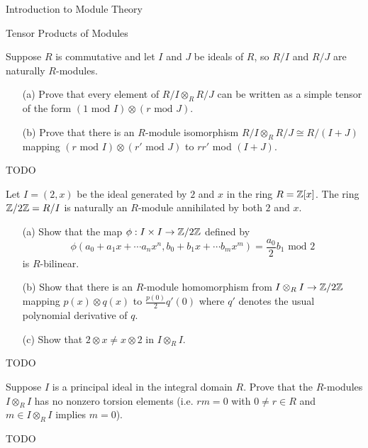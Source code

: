 \begin{chapter}{Introduction to Module Theory}
\begin{section}{Tensor Products of Modules}
\begin{problem}\label{ex:10.4.16}
Suppose $R$ is commutative and let $I$ and $J$ be ideals of $R$, so $R/I$ and $R/J$ are naturally $R$-modules. \begin{enumerate}
\item[(a)] Prove that every element of $R/I\otimes _R R/J$ can be written as a simple tensor of the form $(1\text{ mod } I)\otimes (r\text{ mod } J)$. 
\item[(b)] Prove that there is an $R$-module isomorphism $R/I\otimes_R R/J\cong R/(I+J)$ mapping $(r\text{ mod } I)\otimes (r'\text{ mod } J)$ to $rr'$ mod $(I+J)$. 
\end{enumerate}
\end{problem}
\begin{solution}TODO

\end{solution}\oneperpage



\begin{problem}\label{ex:10.4.17}
Let $I=(2,x)$ be the ideal generated by $2$ and $x$ in the ring $R=\mathbb{Z}[x]$. The ring $\mathbb{Z}/2\mathbb{Z} = R/I$ is naturally an $R$-module annihilated by both $2$ and $x$. \begin{enumerate}
\item[(a)] Show that the map $\phi:I\times I\to \mathbb{Z}/2\mathbb{Z}$ defined by \[
\phi(a_0+a_1x+\cdots a_nx^n,b_0+b_1x+\cdots b_mx^m) = \frac{a_0}{2}b_1\text{ mod } 2 
\]
is $R$-bilinear.
\item[(b)] Show that there is an $R$-module homomorphism from $I\otimes_R I\to\mathbb{Z}/2\mathbb{Z}$ mapping $p(x)\otimes q(x)$ to $\frac{p(0)}{2}q'(0)$ where $q'$ denotes the usual polynomial derivative of $q$. 
\item[(c)] Show that $2\otimes x \neq x\otimes 2$ in $I \otimes_RI$. 
\end{enumerate}
\end{problem}
\begin{solution}TODO

\end{solution}\oneperpage



\begin{problem}\label{ex:10.4.18}
Suppose $I$ is a principal ideal in the integral domain $R$. Prove that the $R$-modules $I\otimes_R I$ has no nonzero torsion elements (i.e. $rm=0$ with $0\neq r \in R$ and $m\in I\otimes _RI$ implies $m=0$). 
\end{problem}
\begin{solution}TODO


\end{solution}
\end{section}
\end{chapter}
